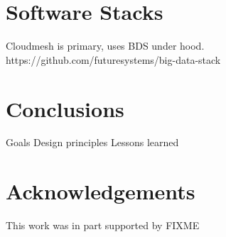 \documentclass[9pt,twocolumn,twoside]{styles/osajnl}
\begin{document}
	

	

	





\section{Software Stacks}

Cloudmesh is primary, uses BDS under hood.
https://github.com/futuresystems/big-data-stack


\section{Conclusions}

Goals
Design principles
Lessons learned




\section*{Acknowledgements}

This work was in part supported by FIXME




 
\end{document}
